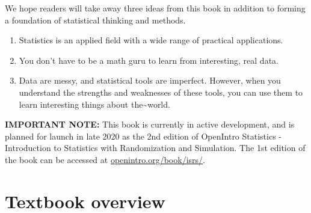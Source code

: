 \documentclass[]{book}
\providecommand{\tightlist}{%
  \setlength{\itemsep}{0pt}\setlength{\parskip}{0pt}}
\begin{document}
We hope readers will take away three ideas from this book in addition to forming a foundation of statistical thinking and methods.

\begin{enumerate}
\def\labelenumi{\arabic{enumi}.}
\tightlist
\item
  Statistics is an applied field with a wide range of practical applications.
\item
  You don't have to be a math guru to learn from interesting, real data.
\item
  Data are messy, and statistical tools are imperfect. However, when you understand the strengths and weaknesses of these tools, you can use them to learn interesting things about the\textasciitilde{}world.
\end{enumerate}

\textbf{IMPORTANT NOTE:} This book is currently in active development, and is planned for launch in late 2020 as the 2nd edition of OpenIntro Statistics - Introduction to Statistics with Randomization and Simulation. The 1st edition of the book can be accessed at \href{https://www.openintro.org/book/isrs/}{openintro.org/book/isrs/}.

\hypertarget{textbook-overview}{%
\section*{Textbook overview}\label{textbook-overview}}
\end{document}
